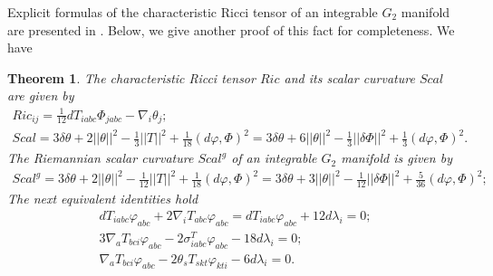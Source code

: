 \documentclass[10pt,british]{article}
\newtheorem{thrm}{Theorem}[section]
\def\sb {{\nabla}}
\def\p{{\varphi}}
\def\ph{{\Phi}}
\begin{document}
Explicit formulas of the characteristic Ricci tensor of an integrable $G_2$ manifold are presented in \cite{FI,FI1}. Below, we give another proof of this fact for completeness. We have
\begin{thrm}\cite{FI, FI1}\label{thRic}
The characteristic Ricci tensor $Ric$ and its scalar curvature $Scal$  are given by
\begin{equation}\label{ricg2}
\begin{split}
Ric_{ij}=\frac1{12}dT_{iabc}\ph_{jabc}-\sb_i\theta_j;\\
Scal=3\delta\theta+2||\theta||^2-\frac13||T||^2+\frac1{18}(d\p,\ph)^2%
=3\delta\theta+6||\theta||^2-\frac13||\delta\ph||^2+\frac13(d\p,\ph)^2.
\end{split}
\end{equation}
The Riemannian scalar curvature $Scal^g$ of an integrable $G_2$ manifold is given by
\begin{equation}\label{scal1}
\begin{split}
Scal^g=3\delta\theta+2||\theta||^2-\frac1{12}||T||^2+\frac1{18}(d\p,\ph)^2%
=3\delta\theta+3||\theta||^2-\frac1{12}||\delta\ph||^2+\frac5{36}(d\p,\ph)^2;
\end{split}
\end{equation}
The next equivalent identities hold
\begin{equation}\label{dtt}
\begin{split}
dT_{iabc}\p_{abc}+2\sb_iT_{abc}\p_{abc}=
dT_{iabc}\p_{abc}+12d\lambda_i=0;\\
 3\sb_aT_{bci}\p_{abc}-2\sigma^T_{iabc}\p_{abc}-18d\lambda_i=0;\\
\sb_aT_{bci}\p_{abc}-2\theta_sT_{skt}\p_{kti}-6d\lambda_i=0.
\end{split}
\end{equation}
\end{thrm}
\end{document}
